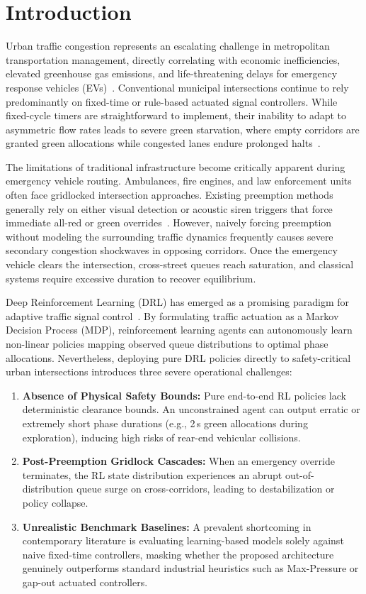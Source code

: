 \section{Introduction}
\label{sec:introduction}

Urban traffic congestion represents an escalating challenge in metropolitan transportation management, directly correlating with economic inefficiencies, elevated greenhouse gas emissions, and life-threatening delays for emergency response vehicles (EVs)~\cite{webster1958, mnih2015human}. Conventional municipal intersections continue to rely predominantly on fixed-time or rule-based actuated signal controllers. While fixed-cycle timers are straightforward to implement, their inability to adapt to asymmetric flow rates leads to severe green starvation, where empty corridors are granted green allocations while congested lanes endure prolonged halts~\cite{lowrie1990scats}.

The limitations of traditional infrastructure become critically apparent during emergency vehicle routing. Ambulances, fire engines, and law enforcement units often face gridlocked intersection approaches. Existing preemption methods generally rely on either visual detection or acoustic siren triggers that force immediate all-red or green overrides~\cite{cucchiara2003detecting, salamon2014urbansound}. However, naively forcing preemption without modeling the surrounding traffic dynamics frequently causes severe secondary congestion shockwaves in opposing corridors. Once the emergency vehicle clears the intersection, cross-street queues reach saturation, and classical systems require excessive duration to recover equilibrium.

Deep Reinforcement Learning (DRL) has emerged as a promising paradigm for adaptive traffic signal control~\cite{wei2018intellilight, liang2019deep}. By formulating traffic actuation as a Markov Decision Process (MDP), reinforcement learning agents can autonomously learn non-linear policies mapping observed queue distributions to optimal phase allocations. Nevertheless, deploying pure DRL policies directly to safety-critical urban intersections introduces three severe operational challenges:
\begin{enumerate}
    \item \textbf{Absence of Physical Safety Bounds:} Pure end-to-end RL policies lack deterministic clearance bounds. An unconstrained agent can output erratic or extremely short phase durations (e.g., 2\,s green allocations during exploration), inducing high risks of rear-end vehicular collisions.
    \item \textbf{Post-Preemption Gridlock Cascades:} When an emergency override terminates, the RL state distribution experiences an abrupt out-of-distribution queue surge on cross-corridors, leading to destabilization or policy collapse.
    \item \textbf{Unrealistic Benchmark Baselines:} A prevalent shortcoming in contemporary literature is evaluating learning-based models solely against naive fixed-time controllers, masking whether the proposed architecture genuinely outperforms standard industrial heuristics such as Max-Pressure or gap-out actuated controllers.
\end{enumerate}

